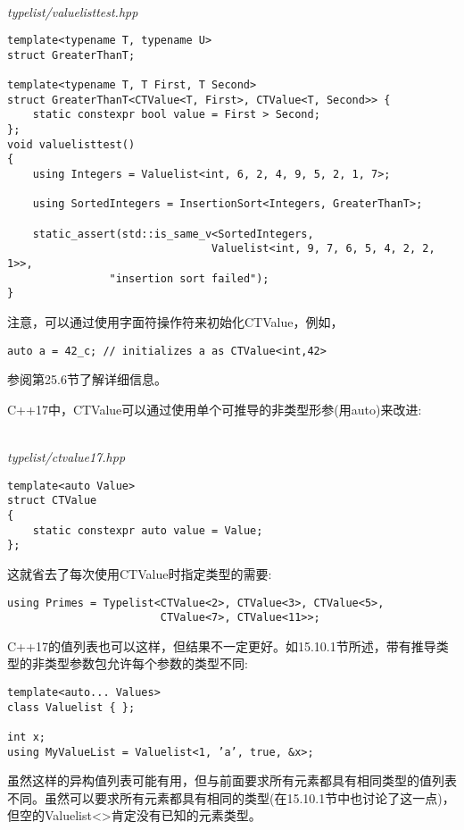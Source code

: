 \hspace*{\fill} \\ %
\noindent
\textit{typelist/valuelisttest.hpp}
\begin{lstlisting}[style=styleCXX]
template<typename T, typename U>
struct GreaterThanT;

template<typename T, T First, T Second>
struct GreaterThanT<CTValue<T, First>, CTValue<T, Second>> {
	static constexpr bool value = First > Second;
};
void valuelisttest()
{
	using Integers = Valuelist<int, 6, 2, 4, 9, 5, 2, 1, 7>;
	
	using SortedIntegers = InsertionSort<Integers, GreaterThanT>;
	
	static_assert(std::is_same_v<SortedIntegers,
								Valuelist<int, 9, 7, 6, 5, 4, 2, 2, 1>>,
				"insertion sort failed");
}
\end{lstlisting}

注意，可以通过使用字面符操作符来初始化CTValue，例如，

\begin{lstlisting}[style=styleCXX]
auto a = 42_c; // initializes a as CTValue<int,42>
\end{lstlisting}

参阅第25.6节了解详细信息。


C++17中，CTValue可以通过使用单个可推导的非类型形参(用auto)来改进:

\hspace*{\fill} \\ %
\noindent
\textit{typelist/ctvalue17.hpp}
\begin{lstlisting}[style=styleCXX]
template<auto Value>
struct CTValue
{
	static constexpr auto value = Value;
};
\end{lstlisting}

这就省去了每次使用CTValue时指定类型的需要:

\begin{lstlisting}[style=styleCXX]
using Primes = Typelist<CTValue<2>, CTValue<3>, CTValue<5>,
						CTValue<7>, CTValue<11>>;
\end{lstlisting}

C++17的值列表也可以这样，但结果不一定更好。如15.10.1节所述，带有推导类型的非类型参数包允许每个参数的类型不同:

\begin{lstlisting}[style=styleCXX]
template<auto... Values>
class Valuelist { };

int x;
using MyValueList = Valuelist<1, ’a’, true, &x>;
\end{lstlisting}

虽然这样的异构值列表可能有用，但与前面要求所有元素都具有相同类型的值列表不同。虽然可以要求所有元素都具有相同的类型(在15.10.1节中也讨论了这一点)，但空的Valuelist<>肯定没有已知的元素类型。













